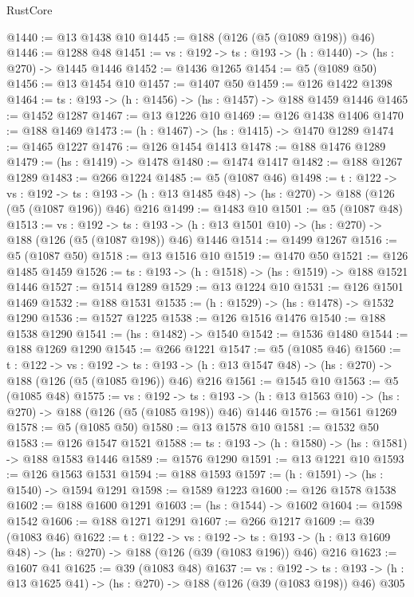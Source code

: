 \begin{lexlean}{RustCore}
\begin{coremodule}
@1440 := @13 @1438 @10
@1445 := @188 (@126 (@5 (@1089 @198)) @46)
@1446 := @1288 @48
@1451 := {vs : @192} -> {ts : @193} -> (h : @1440) -> (hs : @270) -> @1445 @1446
@1452 := @1436 @1265
@1454 := @5 (@1089 @50)
@1456 := @13 @1454 @10
@1457 := @1407 @50
@1459 := @126 @1422 @1398
@1464 := {ts : @193} -> (h : @1456) -> (hs : @1457) -> @188 @1459 @1446
@1465 := @1452 @1287
@1467 := @13 @1226 @10
@1469 := @126 @1438 @1406
@1470 := @188 @1469
@1473 := (h : @1467) -> (hs : @1415) -> @1470 @1289
@1474 := @1465 @1227
@1476 := @126 @1454 @1413
@1478 := @188 @1476 @1289
@1479 := (hs : @1419) -> @1478
@1480 := @1474 @1417
@1482 := @188 @1267 @1289
@1483 := @266 @1224
@1485 := @5 (@1087 @46)
@1498 := {t : @122} ->
  {vs : @192} ->
  {ts : @193} -> (h : @13 @1485 @48) -> (hs : @270) -> @188 (@126 (@5 (@1087 @196)) @46) @216
@1499 := @1483 @10
@1501 := @5 (@1087 @48)
@1513 := {vs : @192} ->
  {ts : @193} -> (h : @13 @1501 @10) -> (hs : @270) -> @188 (@126 (@5 (@1087 @198)) @46) @1446
@1514 := @1499 @1267
@1516 := @5 (@1087 @50)
@1518 := @13 @1516 @10
@1519 := @1470 @50
@1521 := @126 @1485 @1459
@1526 := {ts : @193} -> (h : @1518) -> (hs : @1519) -> @188 @1521 @1446
@1527 := @1514 @1289
@1529 := @13 @1224 @10
@1531 := @126 @1501 @1469
@1532 := @188 @1531
@1535 := (h : @1529) -> (hs : @1478) -> @1532 @1290
@1536 := @1527 @1225
@1538 := @126 @1516 @1476
@1540 := @188 @1538 @1290
@1541 := (hs : @1482) -> @1540
@1542 := @1536 @1480
@1544 := @188 @1269 @1290
@1545 := @266 @1221
@1547 := @5 (@1085 @46)
@1560 := {t : @122} ->
  {vs : @192} ->
  {ts : @193} -> (h : @13 @1547 @48) -> (hs : @270) -> @188 (@126 (@5 (@1085 @196)) @46) @216
@1561 := @1545 @10
@1563 := @5 (@1085 @48)
@1575 := {vs : @192} ->
  {ts : @193} -> (h : @13 @1563 @10) -> (hs : @270) -> @188 (@126 (@5 (@1085 @198)) @46) @1446
@1576 := @1561 @1269
@1578 := @5 (@1085 @50)
@1580 := @13 @1578 @10
@1581 := @1532 @50
@1583 := @126 @1547 @1521
@1588 := {ts : @193} -> (h : @1580) -> (hs : @1581) -> @188 @1583 @1446
@1589 := @1576 @1290
@1591 := @13 @1221 @10
@1593 := @126 @1563 @1531
@1594 := @188 @1593
@1597 := (h : @1591) -> (hs : @1540) -> @1594 @1291
@1598 := @1589 @1223
@1600 := @126 @1578 @1538
@1602 := @188 @1600 @1291
@1603 := (hs : @1544) -> @1602
@1604 := @1598 @1542
@1606 := @188 @1271 @1291
@1607 := @266 @1217
@1609 := @39 (@1083 @46)
@1622 := {t : @122} ->
  {vs : @192} ->
  {ts : @193} -> (h : @13 @1609 @48) -> (hs : @270) -> @188 (@126 (@39 (@1083 @196)) @46) @216
@1623 := @1607 @41
@1625 := @39 (@1083 @48)
@1637 := {vs : @192} ->
  {ts : @193} -> (h : @13 @1625 @41) -> (hs : @270) -> @188 (@126 (@39 (@1083 @198)) @46) @305

\end{coremodule}
\end{lexlean}
